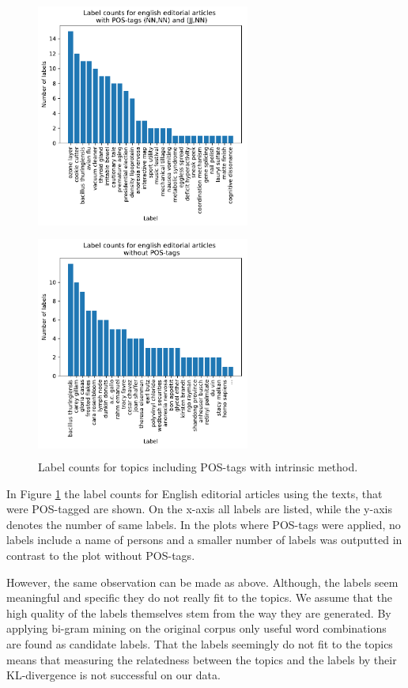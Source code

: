 {\begin{figure}[h]
\begin{minipage}[t]{0.5\textwidth}
	\end{minipage}
	\begin{minipage}[t]{0.5\textwidth}
		\includegraphics[width=7cm,height=7.5cm]{gfx/POS-gen1/mit_beiden_pos.pdf}
	\end{minipage}
	\begin{minipage}[t]{0.5\textwidth}
		\includegraphics[width=7cm,height=7.5cm]{gfx/POS-gen1/ohne_POS.pdf}
	\end{minipage}
	\caption{Label counts for topics including \ac{POS}-tags with intrinsic method.}
	\label{fig:labelcount_intrinsic_pos}
\end{figure}
In Figure \ref{fig:labelcount_intrinsic_pos} the label counts for English editorial articles using the texts, that were \ac{POS}-tagged are shown. On the x-axis all labels are listed, while the y-axis denotes the number of same labels. 
In the plots where \ac{POS}-tags were applied, no labels include a name of persons and a smaller number of labels was outputted in contrast to the plot without \ac{POS}-tags. 

However, the same observation can be made as above. Although, the labels seem meaningful and specific they do not really fit to the topics. We assume that the high quality of the labels themselves stem from the way they are generated. By applying bi-gram mining on the original corpus only useful word combinations are found as candidate labels. That the labels seemingly do not fit to the topics means that measuring the relatedness between the topics and the labels by their KL-divergence is not successful on our data.


}
